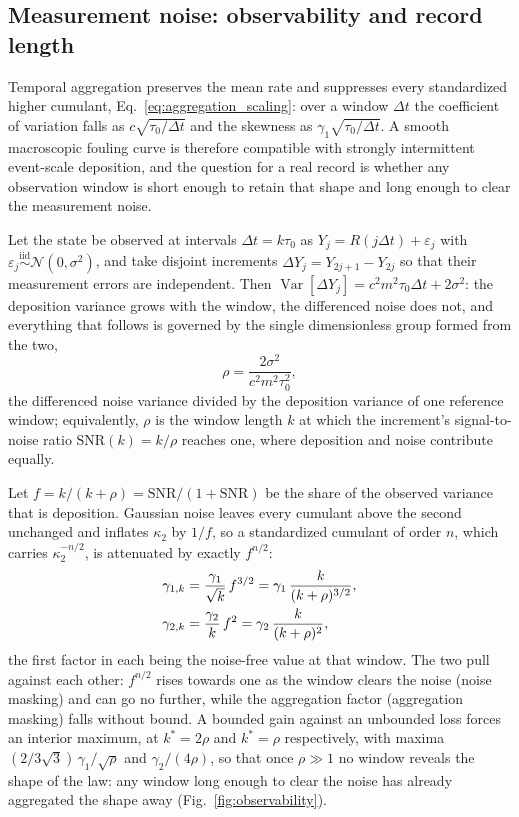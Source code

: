 \documentclass[preprint,12pt]{elsarticle}
\begin{document}
\subsection{Measurement noise: observability and record length}
\label{sec:observability}

Temporal aggregation preserves the mean rate and suppresses every standardized
higher cumulant, Eq.~\eqref{eq:aggregation_scaling}: over a window $\Delta t$
the coefficient of variation falls as $c\sqrt{\tau_0/\Delta t}$ and the
skewness as $\gamma_1\sqrt{\tau_0/\Delta t}$. A smooth macroscopic fouling
curve is therefore compatible with strongly intermittent event-scale
deposition, and the question for a real record is whether any observation
window is short enough to retain that shape and long enough to clear the
measurement noise.

Let the state be observed at intervals $\Delta t=k\tau_0$ as
$Y_j=R(j\Delta t)+\varepsilon_j$ with
$\varepsilon_j\overset{\mathrm{iid}}{\sim}\mathcal{N}(0,\sigma^2)$, and take
disjoint increments $\Delta Y_j=Y_{2j+1}-Y_{2j}$ so that their measurement
errors are independent. Then
$\operatorname{Var}[\Delta Y_j]=c^2m^2\tau_0\Delta t+2\sigma^2$: the
deposition variance grows with the window, the differenced noise does not, and
everything that follows is governed by the single dimensionless group formed
from the two,
\begin{equation}
  \rho=\frac{2\sigma^2}{c^2m^2\tau_0^{2}},
  \label{eq:rho}
\end{equation}
the differenced noise variance divided by the deposition variance of one
reference window; equivalently, $\rho$ is the window length $k$ at which the
increment's signal-to-noise ratio $\mathrm{SNR}(k)=k/\rho$ reaches one, where
deposition and noise contribute equally.

Let $f=k/(k+\rho)=\mathrm{SNR}/(1+\mathrm{SNR})$ be the share of the observed
variance that is deposition. Gaussian noise leaves every cumulant above the
second unchanged and inflates $\kappa_2$ by $1/f$, so a standardized cumulant
of order $n$, which carries $\kappa_2^{-n/2}$, is attenuated by exactly
$f^{n/2}$:
\begin{align}
  \gamma_{1,k}&=\frac{\gamma_1}{\sqrt k}\,f^{3/2}
              =\gamma_1\,\frac{k}{(k+\rho)^{3/2}},\notag\\
  \gamma_{2,k}&=\frac{\gamma_2}{k}\,f^{2}
              =\gamma_2\,\frac{k}{(k+\rho)^{2}},
  \label{eq:attenuated_shape}
\end{align}
the first factor in each being the noise-free value at that window. The two
pull against each other: $f^{n/2}$ rises towards one as the window clears the
noise (noise masking) and can go no further, while the aggregation factor
(aggregation masking) falls without bound.
A bounded gain against an unbounded loss forces an interior maximum, at
$k^\ast=2\rho$ and $k^\ast=\rho$ respectively, with maxima $(2/3\sqrt3)\,\gamma_1/\sqrt\rho$ and
$\gamma_2/(4\rho)$, so that once $\rho\gg1$ no window reveals the shape of the
law: any window long enough to clear the noise has already aggregated the
shape away (Fig.~\ref{fig:observability}).
\end{document}
